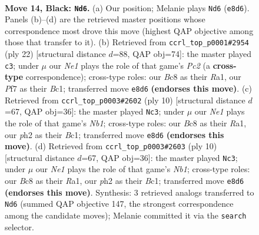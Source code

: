 \documentclass[11pt]{article}
\begin{document}
\clearpage

\begin{figure}[p]\centering
\begin{subfigure}{0.46\textwidth}\centering
\resizebox{\linewidth}{!}{%
\newchessgame
\chessboard[
  setfen={r1bqnrk1/pp1pppbp/8/2p5/2P3Q1/2N2N2/PP1P1PBP/R1B2RK1 b - - 2 14},
  showmover=false,
  pgfstyle=straightmove, color=movearrow, markmove={e8-d6}
]}
\caption{}
\end{subfigure}\hfill
\begin{subfigure}{0.46\textwidth}\centering
\resizebox{\linewidth}{!}{%
\newchessgame
\chessboard[
  setfen={r1b2rk1/pp2bppp/3qpn2/8/2BN4/8/PPP2PPP/R1BQR1K1 w - - 1 12},
  showmover=false,
  pgfstyle=straightmove, color=movearrow, markmove={c2-c3}
]}
\caption{}
\end{subfigure}
\\[4pt]
\begin{subfigure}{0.46\textwidth}\centering
\resizebox{\linewidth}{!}{%
\newchessgame
\chessboard[
  setfen={rnb1kb1r/pp2pppp/5n2/3q4/3N4/8/PP2PPPP/RNBQKB1R w KQkq - 0 6},
  showmover=false,
  pgfstyle=straightmove, color=movearrow, markmove={b1-c3}
]}
\caption{}
\end{subfigure}\hfill
\begin{subfigure}{0.46\textwidth}\centering
\resizebox{\linewidth}{!}{%
\newchessgame
\chessboard[
  setfen={rnb1kb1r/pp2pppp/5n2/3q4/3N4/8/PP2PPPP/RNBQKB1R w KQkq - 0 6},
  showmover=false,
  pgfstyle=straightmove, color=movearrow, markmove={b1-c3}
]}
\caption{}
\end{subfigure}
\caption{\textbf{Move 14, Black: \texttt{Nd6}.} (a) Our position; Melanie plays \texttt{Nd6} (\texttt{e8d6}). Panels (b)--(d) are the retrieved master positions whose correspondence most drove this move (highest QAP objective among those that transfer to it). (b) Retrieved from \texttt{ccrl\_top\_p0001\#2954} (ply 22) [structural distance $d$=88, QAP obj=74]: the master played \texttt{c3}; under $\mu$ our \emph{Ne1} plays the role of that game's \emph{Pc2} (a \textbf{cross-type} correspondence); cross-type roles: our \emph{B}c8 as their \emph{R}a1, our \emph{P}f7 as their \emph{B}c1; transferred move \texttt{e8d6} \textbf{(endorses this move)}. (c) Retrieved from \texttt{ccrl\_top\_p0003\#2602} (ply 10) [structural distance $d$=67, QAP obj=36]: the master played \texttt{Nc3}; under $\mu$ our \emph{Ne1} plays the role of that game's \emph{Nb1}; cross-type roles: our \emph{B}c8 as their \emph{R}a1, our \emph{p}h2 as their \emph{B}c1; transferred move \texttt{e8d6} \textbf{(endorses this move)}. (d) Retrieved from \texttt{ccrl\_top\_p0003\#2603} (ply 10) [structural distance $d$=67, QAP obj=36]: the master played \texttt{Nc3}; under $\mu$ our \emph{Ne1} plays the role of that game's \emph{Nb1}; cross-type roles: our \emph{B}c8 as their \emph{R}a1, our \emph{p}h2 as their \emph{B}c1; transferred move \texttt{e8d6} \textbf{(endorses this move)}. Synthesis: 3 retrieved analogs transferred to \texttt{Nd6} (summed QAP objective 147, the strongest correspondence among the candidate moves); Melanie committed it via the \texttt{search} selector.}
\label{fig:thought-m27}
\end{figure}
\end{document}
